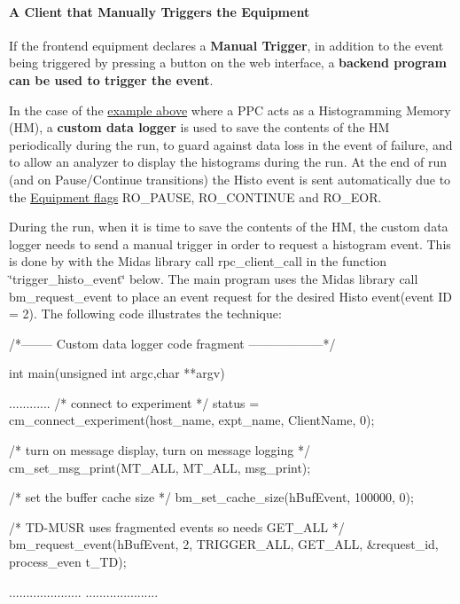 \label{FE_eq_event_routines_idx_event_manual-trigger_client}
\hypertarget{FE_eq_event_routines_idx_event_manual-trigger_client}{}
 \hypertarget{FE_eq_event_routines_FE_backend_Manual_Trigger}{}\paragraph{A Client that Manually Triggers the Equipment}\label{FE_eq_event_routines_FE_backend_Manual_Trigger}
If the frontend equipment declares a {\bfseries Manual Trigger}, in addition to the event being triggered by pressing a button on the web interface, a {\bfseries backend program can be used to trigger the event}. \par
 In the case of the \hyperlink{FE_eq_event_routines_FE_manual_trigger}{example above} where a PPC acts as a Histogramming Memory (HM), a {\bfseries  custom data logger } is used to save the contents of the HM periodically during the run, to guard against data loss in the event of failure, and to allow an analyzer to display the histograms during the run. At the end of run (and on Pause/Continue transitions) the Histo event is sent automatically due to the \hyperlink{FE_eq_event_routines_FE_tdmusr_equipment}{Equipment flags} RO\_\-PAUSE, RO\_\-CONTINUE and RO\_\-EOR. \par
 During the run, when it is time to save the contents of the HM, the custom data logger needs to send a manual trigger in order to request a histogram event. This is done by with the Midas library call rpc\_\-client\_\-call in the function \char`\"{}trigger\_\-histo\_\-event\char`\"{} below. The main program uses the Midas library call bm\_\-request\_\-event to place an event request for the desired Histo event(event ID = 2). The following code illustrates the technique:


\begin{DoxyCode}
/*-------- Custom data logger code fragment  ------------------*/

int main(unsigned int argc,char **argv)
{

   ............
   /* connect to experiment */
   status = cm_connect_experiment(host_name, expt_name, ClientName, 0);

   /* turn on message display, turn on message logging */
    cm_set_msg_print(MT_ALL, MT_ALL, msg_print);

 
   /* set the buffer cache size */
    bm_set_cache_size(hBufEvent, 100000, 0);

   /* TD-MUSR uses fragmented events so needs GET_ALL  */
   bm_request_event(hBufEvent, 2, TRIGGER_ALL, GET_ALL, &request_id, process_even
      t_TD);

   .....................
   .....................
}
\end{DoxyCode}


